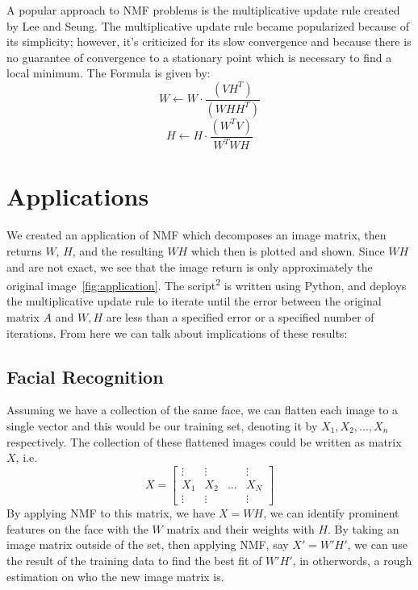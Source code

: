 \documentclass[
10pt, %
a4paper, %
oneside, %
headinclude,footinclude, %
BCOR5mm, %
]{scrartcl}
\begin{document}
A popular approach to NMF problems is the multiplicative update rule created by Lee and Seung.
The multiplicative update rule became popularized because of its simplicity;
however, it's criticized for its slow convergence and because there is no guarantee of convergence to a stationary point which is necessary to find a local minimum.
The Formula is given by:
$$W\leftarrow W\cdot\frac{(VH^{T})}{(WHH^{T})}$$
$$H\leftarrow H\cdot\frac{(W^{T}V)}{W^{T}WH}$$


\section{Applications}

We created an application of NMF which decomposes an image matrix, then returns $W$, $H$, and the resulting $WH$ which then is plotted and shown. Since $WH$ and are not exact, we see that the image return is only approximately the original image~\vref{fig:application}. The script\textsuperscript{2} is written using Python, and deploys the multiplicative update rule to iterate until the error between the original matrix $A$ and $W,H$ are less than a specified error or a specified number of iterations. From here we can talk about implications of these results:

\let\thefootnote\relax{}

\subsection{Facial Recognition}
Assuming we have a collection of the same face, we can flatten each image to a single vector and this would be our training set, denoting it by $X_{1},X_{2},...,X_{n}$ respectively. The collection of these flattened images could be written as matrix $X$, i.e.
$$X=\begin{bmatrix}
        \vdots & \vdots &       & \vdots \\
        X_{1}  & X_{2}  & \dots & X_{N}  \\
        \vdots & \vdots &       & \vdots
    \end{bmatrix}$$
By applying NMF to this matrix, we have $X=WH$, we can identify prominent features on the face with the $W$ matrix and their weights with $H$. By taking an image matrix outside of the set, then applying NMF, say $X'=W'H'$, we can use the result of the training data to find the best fit of $W'H'$, in otherwords, a rough estimation on who the new image matrix is.
\end{document}

